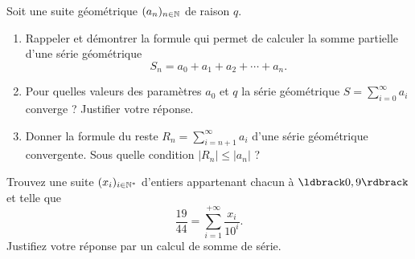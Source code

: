 \documentclass[a4paper,12pt,reqno]{amsart}
\begin{document}


\begin{exo} %

  Soit une suite géométrique $(a_{n})_{n \in \mathbb{N}}$ de raison $q$.
  \begin{enumerate}
    \item Rappeler et démontrer la formule qui permet de calculer la somme partielle d'une série géométrique
      \[
        S_{n}=a_{0}+a_{1}+a_{2}+\cdots+a_{n}.
      \]

    \item Pour quelles valeurs des paramètres $a_{0}$ et $q$ la série géométrique $S = \sum_{i=0}^{\infty} a_{i}$ converge ? Justifier votre réponse.

    \item Donner la formule du reste $R_{n} = \sum_{i=n+1}^{\infty} a_{i}$ d'une série géométrique convergente. Sous quelle condition $| R_{n} | \leq | a_{n} |$ ?
  \end{enumerate}

\end{exo}

\begin{exo} %

  Trouvez une suite $(x_i)_{i \in \mathbb{N}^*}$ d'entiers appartenant chacun à $\ldbrack 0,9 \rdbrack$ et telle que
    \[
      \frac{19}{44}=\sum_{i=1}^{+\infty}\frac{x_i}{10^i}.
    \]
  Justifiez votre réponse par un calcul de somme de série.

\end{exo}
\end{document}
